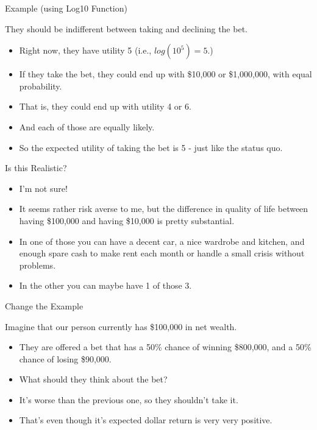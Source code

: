 \documentclass[
  ignorenonframetext,
]{beamer}
\providecommand{\tightlist}{%
  \setlength{\itemsep}{0pt}\setlength{\parskip}{0pt}}
\renewcommand{\,}{\text{, }}
\begin{document}
\begin{frame}{Example (using Log10 Function)}
\protect\hypertarget{example-using-log10-function-1}{}

They should be indifferent between taking and declining the bet.

\begin{itemize}
\tightlist
\item
  Right now, they have utility 5 (i.e., \(log(10^5) = 5\).) \pause
\item
  If they take the bet, they could end up with \$10,000 or \$1,000,000,
  with equal probability.
\item
  That is, they could end up with utility 4 or 6.
\item
  And each of those are equally likely.
\item
  So the expected utility of taking the bet is 5 - just like the status
  quo.
\end{itemize}

\end{frame}

\begin{frame}{Is this Realistic?}
\protect\hypertarget{is-this-realistic}{}

\begin{itemize}
\tightlist
\item
  I'm not sure!
\item
  It seems rather risk averse to me, but the difference in quality of
  life between having \$100,000 and having \$10,000 is pretty
  substantial.
\item
  In one of those you can have a decent car, a nice wardrobe and
  kitchen, and enough spare cash to make rent each month or handle a
  small crisis without problems.
\item
  In the other you can maybe have 1 of those 3.
\end{itemize}

\end{frame}

\begin{frame}{Change the Example}
\protect\hypertarget{change-the-example}{}

Imagine that our person currently has \$100,000 in net wealth.

\begin{itemize}
\tightlist
\item
  They are offered a bet that has a 50\% chance of winning \$800,000,
  and a 50\% chance of losing \$90,000.
\item
  What should they think about the bet? \pause
\item
  It's worse than the previous one, so they shouldn't take it.
\item
  That's even though it's expected dollar return is very very positive.
\end{itemize}

\end{frame}
\end{document}
